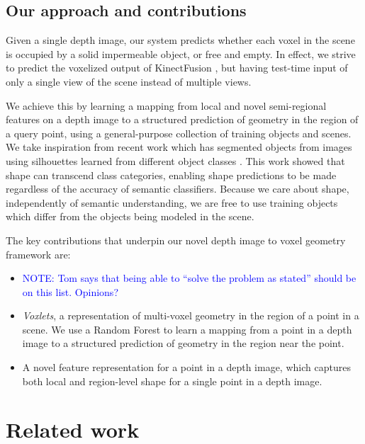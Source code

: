 \documentclass[10pt,twocolumn,letterpaper]{article}
\newcommand{\note}[1]{\textcolor{blue}{NOTE: #1}}
\begin{document}
\subsection{Our approach and contributions}

Given a single depth image, our system predicts whether each voxel in the scene is occupied by a solid impermeable object, or free and empty.
In effect, we strive to predict the voxelized output of KinectFusion \cite{izadi-uist-2011}, but having test-time input of only a single view of the scene instead of multiple views.

We achieve this by learning a mapping from local and novel semi-regional features on a depth image to a structured prediction of geometry in the region of a query point, using a general-purpose collection of training objects and scenes.
We take inspiration from recent work which has segmented objects from images using silhouettes learned from different object classes \cite{kim-eccv-2012}.
This work showed that shape can transcend class categories, enabling shape predictions to be made regardless of the accuracy of semantic classifiers.
Because we care about shape, independently of semantic understanding, we are free to use training objects which differ from the objects being modeled in the scene.

The key contributions that underpin our novel depth image to voxel geometry framework are:
\begin{itemize}
\item \note{Tom says that being able to ``solve the problem as stated'' should be on this list. Opinions?}
\item \emph{Voxlets}, a representation of multi-voxel geometry in the region of a point in a scene. 
We use a Random Forest to learn a mapping from a point in a depth image to a structured prediction of geometry in the region near the point.
\item A novel feature representation for a point in a depth image, which captures both local and region-level shape for a single point in a depth image.
\end{itemize}


\section{Related work}
\end{document}

